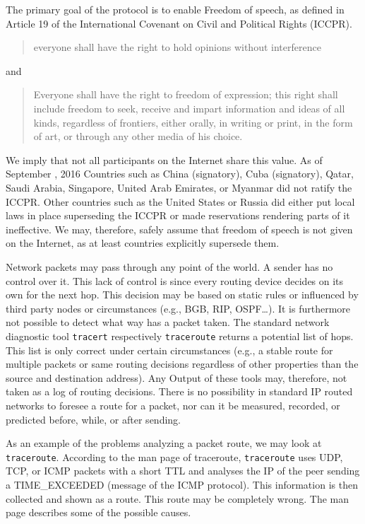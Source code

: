 The primary goal of the protocol is to enable Freedom of speech, as defined in Article 19 of the International Covenant on Civil and Political Rights (ICCPR)\cite{iccpr}.
\begin{quote}
	everyone shall have the right to hold opinions without interference 
\end{quote}
and
\begin{quote}
	Everyone shall have the right to freedom of expression; this right shall include freedom to seek, receive and impart information and ideas of all kinds, regardless of frontiers, either orally, in writing or print, in the form of art, or through any other media of his choice.
\end{quote}

We imply that not all participants on the Internet share this value. As of September , 2016 Countries such as China (signatory), Cuba (signatory), Qatar, Saudi Arabia, Singapore, United Arab Emirates, or Myanmar did not ratify the ICCPR. Other countries such as the United States or Russia did either put local laws in place superseding the ICCPR or made reservations rendering parts of it ineffective. We may, therefore, safely assume that freedom of speech is not given on the Internet, as at least countries explicitly supersede them.

Network packets may pass through any point of the world. A sender has no control over it. This lack of control is since every routing device decides on its own for the next hop. This decision may be based on static rules or influenced by third party nodes or circumstances (e.g., BGB, RIP, OSPF\ldots). It is furthermore not possible to detect what way has a packet taken. The standard network diagnostic tool \verb|tracert| respectively \verb|traceroute| returns a potential list of hops. This list is only correct under certain circumstances (e.g., a stable route for multiple packets or same routing decisions regardless of other properties than the source and destination address). Any Output of these tools may, therefore, not taken as a log of routing decisions. There is no possibility in standard IP routed networks to foresee a route for a packet, nor can it be measured, recorded, or predicted before, while, or after sending. 

As an example of the problems analyzing a packet route, we may look at \verb|traceroute|. According to the man page of traceroute, \verb|traceroute| uses UDP, TCP, or ICMP packets with a short TTL and analyses the IP of the peer sending a TIME\_EXCEEDED (message of the ICMP protocol). This information is then collected and shown as a route. This route may be completely wrong. The man page describes some of the possible causes.


